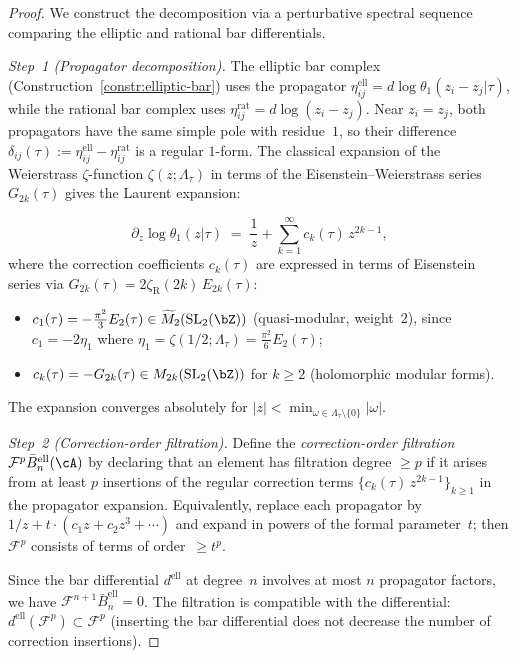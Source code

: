 \begin{proof}
We construct the decomposition via a perturbative spectral sequence
comparing the elliptic and rational bar differentials.

\emph{Step~1 (Propagator decomposition).}
The elliptic bar complex (Construction~\ref{constr:elliptic-bar})
uses the propagator $\eta_{ij}^{\mathrm{ell}} = d\log\theta_1(z_i -
z_j|\tau)$, while the rational bar complex uses $\eta_{ij}^{\mathrm{rat}}
= d\log(z_i - z_j)$. Near $z_i = z_j$, both propagators have the same
simple pole with residue~$1$, so their difference $\delta_{ij}(\tau) :=
\eta_{ij}^{\mathrm{ell}} - \eta_{ij}^{\mathrm{rat}}$ is a regular
$1$-form. The classical expansion of the Weierstrass $\zeta$-function
$\zeta(z;\Lambda_\tau)$ in terms of the Eisenstein--Weierstrass series
$G_{2k}(\tau)$ gives the Laurent expansion:

\[
\partial_z\log\theta_1(z|\tau)
\;=\; \frac{1}{z} + \sum_{k=1}^{\infty} c_k(\tau)\,z^{2k-1},
\]
where the correction coefficients $c_k(\tau)$ are expressed in terms
of Eisenstein series via $G_{2k}(\tau) = 2\zeta_{\mathrm{R}}(2k)\,
E_{2k}(\tau)$:
\begin{itemize}
\item $c_1(\tau) = -\tfrac{\pi^2}{3}E_2(\tau) \in
\widetilde{M}_2(\mathrm{SL}_2(\bZ))$ (quasi-modular, weight~$2$),
since $c_1 = -2\eta_1$ where
$\eta_1 = \zeta(1/2;\Lambda_\tau) = \tfrac{\pi^2}{6}E_2(\tau)$;
\item $c_k(\tau) = -G_{2k}(\tau) \in M_{2k}(\mathrm{SL}_2(\bZ))$
for $k \geq 2$ (holomorphic modular forms).
\end{itemize}
The expansion converges absolutely for $|z| < \min_{\omega \in
\Lambda_\tau \setminus\{0\}} |\omega|$.

\emph{Step~2 (Correction-order filtration).}
Define the \emph{correction-order filtration}
$\mathcal{F}^p \bar{B}^{\mathrm{ell}}_n(\cA)$ by
declaring that an element has filtration degree $\geq p$ if it arises
from at least $p$ insertions of the regular correction terms
$\{c_k(\tau)\,z^{2k-1}\}_{k \geq 1}$ in the propagator expansion.
Equivalently, replace each propagator by $1/z + t\cdot(c_1 z + c_2 z^3
+ \cdots)$ and expand in powers of the formal parameter~$t$; then
$\mathcal{F}^p$ consists of terms of order~$\geq t^p$.

Since the bar differential $d^{\mathrm{ell}}$ at degree~$n$
involves at most $n$ propagator factors, we have $\mathcal{F}^{n+1}
\bar{B}^{\mathrm{ell}}_n = 0$. The filtration is compatible
with the differential: $d^{\mathrm{ell}}(\mathcal{F}^p) \subset
\mathcal{F}^p$ (inserting the bar differential does not decrease
the number of correction insertions).


\end{proof}
